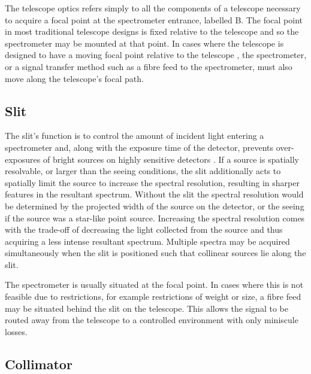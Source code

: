 The telescope optics refers simply to all the components of a telescope necessary to acquire a focal point at the spectrometer entrance, labelled B. The focal point in most traditional telescope designs is fixed relative to the telescope and so the spectrometer may be mounted at that point. In cases where the telescope is designed to have a moving focal point relative to the telescope \cite[see][]{Arecibo, HET, SALT_design}, the spectrometer, or a signal transfer method such as a fibre feed to the spectrometer, must also move along the telescope's focal path.

\subsection{Slit}

The slit's function is to control the amount of incident light entering a spectrometer and, along with the exposure time of the detector, prevents over-exposures of bright sources on highly sensitive detectors \citep{TonkPracAmSpec}. If a source is spatially resolvable, or larger than the seeing conditions, the slit additionally acts to spatially limit the source to increase the spectral resolution, resulting in sharper features in the resultant spectrum. Without the slit the spectral resolution would be determined by the projected width of the source on the detector, or the seeing if the source was a star-like point source. Increasing the spectral resolution comes with the trade-off of decreasing the light collected from the source and thus acquiring a less intense resultant spectrum. Multiple spectra may be acquired simultaneously when the slit is positioned such that collinear sources lie along the slit.

The spectrometer is usually situated at the focal point. In cases where this is not feasible due to restrictions, for example restrictions of weight or size, a fibre feed may be situated behind the slit on the telescope. This allows the signal to be routed away from the telescope to a controlled environment with only miniscule losses.


\subsection{Collimator}

